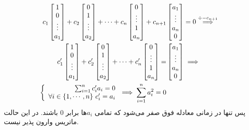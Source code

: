 \begin{align*}
    c_1\begin{bmatrix}
        1\\
        0\\
        \vdots\\
        a_1
    \end{bmatrix}
    + c_2\begin{bmatrix}
        0\\
        1\\
        \vdots\\
        a_2
    \end{bmatrix}
    + \cdots + c_n\begin{bmatrix}
        0\\
        \vdots\\
        1\\
        a_n
    \end{bmatrix}
    +
    c_{n+1}&\begin{bmatrix}
        a_1\\
        \vdots\\
        a_n\\
        0
    \end{bmatrix}
    = 0 \stackrel{\div -c_{n+1}}{\implies} \\
    c_1'\begin{bmatrix}
        1\\
        0\\
        \vdots\\
        a_1
    \end{bmatrix}
    + c_2'\begin{bmatrix}
        0\\
        1\\
        \vdots\\
        a_2
    \end{bmatrix}
    + \cdots + c_n'\begin{bmatrix}
        0\\
        \vdots\\
        1\\
        a_n
    \end{bmatrix}
    =
    &\begin{bmatrix}
        a_1\\
        \vdots\\
        a_n\\
        0
    \end{bmatrix}
    \implies\\
    \quad
    \left\{\begin{array}{r@{\mskip\thickmuskip}l}
        \sum_{i=1}^{n} c_i' a_i = 0\\
        \forall i \in \{1,\cdots,n\} ~ c_i' = a_i
    \end{array}\right.
    \implies
    \sum_{i=1}^{n} a_i^2 = 0
\end{align*}
پس تنها در زمانی معادله فوق صفر می‌شود که تمامی
$a_i$ها
برابر 0 باشند. در این حالت ماتریس وارون پذیر نیست.




